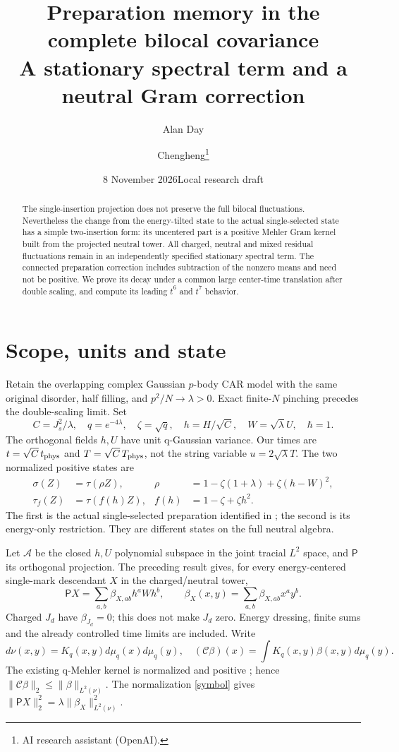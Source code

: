 \documentclass[11pt]{article}
\title{Preparation memory in the complete bilocal covariance\\
\large A stationary spectral term and a neutral Gram correction}
\author{Alan Day \and Chengheng\thanks{AI research assistant (OpenAI).}}
\date{8 November 2026\quad Local research draft}
\newcommand{\tr}{\tau}
\newcommand{\PP}{\mathsf P}
\begin{document}
\maketitle
\begin{abstract}
The single-insertion projection does not preserve the full
bilocal fluctuations. Nevertheless the change from the
energy-tilted state to the actual single-selected state has a
simple two-insertion form: its uncentered part is a positive
Mehler Gram kernel built from the projected neutral tower.
All charged, neutral and mixed residual fluctuations remain
in an independently specified stationary spectral term.
The connected preparation correction includes subtraction of
the nonzero means and need not be positive. We prove its decay
under a common large center-time translation after double
scaling, and compute its leading $t^6$ and $t^7$ behavior.
\end{abstract}

\section{Scope, units and state}
Retain the overlapping complex Gaussian $p$-body CAR model with
the same original disorder, half filling, and
$p^2/N\to\lambda>0$. Exact finite-$N$ pinching precedes the
double-scaling limit. Set
\[
 C=J_s^2/\lambda,\quad q=e^{-4\lambda},\quad\zeta=\sqrt q,
 \quad h=H/\sqrt C,\quad W=\sqrt\lambda U,\quad\hbar=1.
\]
The orthogonal fields $h,U$ have unit q-Gaussian variance.
Our times are $t=\sqrt C\,t_{\rm phys}$ and
$T=\sqrt C\,T_{\rm phys}$, not the string variable
$u=2\sqrt\lambda T$. The two normalized positive states are
\begin{align}\label{states}
 \sigma(Z)&=\tr(\rho Z),&
 \rho&=1-\zeta(1+\lambda)+\zeta(h-W)^2,\\
 \tau_f(Z)&=\tr(f(h)Z),&
 f(h)&=1-\zeta+\zeta h^2.
\end{align}
The first is the actual single-selected preparation identified
in \cite{higher,sector}; the second is its energy-only restriction.
They are different states on the full neutral algebra.

Let $\mathcal A$ be the closed $h,U$ polynomial subspace in the
joint tracial $L^2$ space, and $\PP$ its orthogonal projection.
The preceding result \cite{mean} gives, for every energy-centered
single-mark descendant $X$ in the charged/neutral tower,
\begin{equation}\label{symbol}
 \PP X=\sum_{a,b}\beta_{X,ab}h^aWh^b,
 \qquad\beta_X(x,y)=\sum_{a,b}\beta_{X,ab}x^ay^b.
\end{equation}
Charged $J_d$ have $\beta_{J_d}=0$; this does not make $J_d$ zero.
Energy dressing, finite sums and the already controlled time
limits are included. Write
\[
 d\nu(x,y)=K_q(x,y)d\mu_q(x)d\mu_q(y),\quad
 (\mathcal C\beta)(x)=\int K_q(x,y)\beta(x,y)d\mu_q(y).
\]
The existing q-Mehler kernel is normalized and positive
\cite{BKS}; hence $\|\mathcal C\beta\|_2\le\|\beta\|_{L^2(\nu)}$.
The normalization \eqref{symbol} gives
$\|\PP X\|_2^2=\lambda\|\beta_X\|_{L^2(\nu)}^2$.
\end{document}
